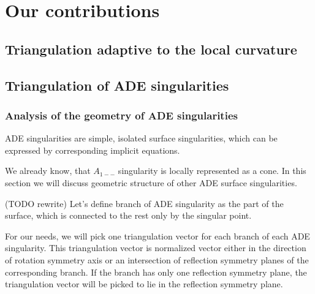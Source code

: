 \chapter{Our contributions}
\label{chap3}

\section{Triangulation adaptive to the local curvature}
\label{sub3.1}

\section{Triangulation of ADE singularities}
\label{sub3.2}

\subsection*{Analysis of the geometry of ADE singularities}

ADE singularities are simple, isolated surface singularities, which can be
expressed by corresponding implicit equations.

We already know, that $A_{1--}$ singularity is locally represented as a cone.
In this section we will discuss geometric structure of other ADE surface singularities.

\begin{definition} (TODO rewrite)
    Let's define branch of ADE singularity as the part of the surface,
    which is connected to the rest only by the singular point.
\end{definition}

For our needs, we will pick one triangulation vector for each branch of
each ADE singularity. This triangulation vector is normalized vector
either in the direction
of rotation symmetry axis or an intersection of reflection symmetry planes
of the corresponding branch. If the branch has only one reflection symmetry
plane, the triangulation vector will be picked to lie in the reflection
symmetry plane.

